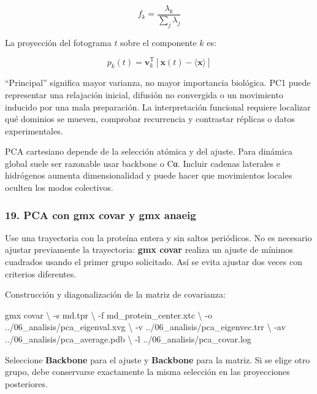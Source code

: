 \documentclass[
  spanish,
  11pt,
  a4paper]{article}
\newenvironment{Shaded}{\begin{snugshade}}{\end{snugshade}}
\newcommand{\AttributeTok}[1]{\textcolor[rgb]{0.13,0.29,0.53}{#1}}
\newcommand{\DataTypeTok}[1]{\textcolor[rgb]{0.13,0.29,0.53}{#1}}
\newcommand{\ExtensionTok}[1]{#1}
\newcommand{\NormalTok}[1]{#1}
\begin{document}
\[
f_k=\frac{\lambda_k}{\sum_j\lambda_j}
\]

La proyección del fotograma \(t\) sobre el componente \(k\) es:

\[
p_k(t)=\mathbf{v}_k^{\mathrm{T}}
\left[\mathbf{x}(t)-\langle\mathbf{x}\rangle\right]
\]

``Principal'' significa mayor varianza, no mayor importancia biológica.
PC1 puede representar una relajación inicial, difusión no convergida o
un movimiento inducido por una mala preparación. La interpretación
funcional requiere localizar qué dominios se mueven, comprobar
recurrencia y contrastar réplicas o datos experimentales.

PCA cartesiano depende de la selección atómica y del ajuste. Para
dinámica global suele ser razonable usar backbone o Cα. Incluir cadenas
laterales e hidrógenos aumenta dimensionalidad y puede hacer que
movimientos locales oculten los modos colectivos.

\subsubsection{19. PCA con gmx covar y gmx
anaeig}\label{pca-con-gmx-covar-y-gmx-anaeig}

Use una trayectoria con la proteína entera y sin saltos periódicos. No
es necesario ajustar previamente la trayectoria: \textbf{gmx covar}
realiza un ajuste de mínimos cuadrados usando el primer grupo
solicitado. Así se evita ajustar dos veces con criterios diferentes.

Construcción y diagonalización de la matriz de covarianza:

\begin{Shaded}
\begin{Highlighting}[]
\ExtensionTok{gmx}\NormalTok{ covar }\DataTypeTok{\textbackslash{}}
    \AttributeTok{{-}s}\NormalTok{ md.tpr }\DataTypeTok{\textbackslash{}}
    \AttributeTok{{-}f}\NormalTok{ md\_protein\_center.xtc }\DataTypeTok{\textbackslash{}}
    \AttributeTok{{-}o}\NormalTok{ ../06\_analisis/pca\_eigenval.xvg }\DataTypeTok{\textbackslash{}}
    \AttributeTok{{-}v}\NormalTok{ ../06\_analisis/pca\_eigenvec.trr }\DataTypeTok{\textbackslash{}}
    \AttributeTok{{-}av}\NormalTok{ ../06\_analisis/pca\_average.pdb }\DataTypeTok{\textbackslash{}}
    \AttributeTok{{-}l}\NormalTok{ ../06\_analisis/pca\_covar.log}
\end{Highlighting}
\end{Shaded}

Seleccione \textbf{Backbone} para el ajuste y \textbf{Backbone} para la
matriz. Si se elige otro grupo, debe conservarse exactamente la misma
selección en las proyecciones posteriores.
\end{document}
